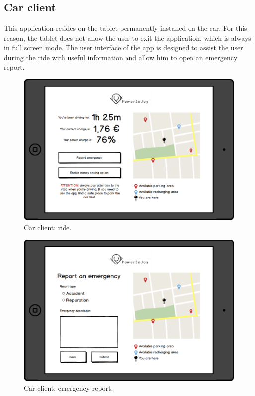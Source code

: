 \subsection{Car client}
	This application resides on the tablet permanently installed on the car. For this reason, the tablet does not allow the user to exit the application, which is always in full screen mode. The user interface of the app is designed to assist the user during the ride with useful information and allow him to open an emergency report.

	\begin{figure}[h]
		\includegraphics[height=0.4\textheight, center]{img/user_interface_design/Car_ride.png}
		\caption{Car client: ride.}
	\end{figure}
	\begin{figure}[h]
		\includegraphics[height=0.4\textheight, center]{img/user_interface_design/Car_emergency_report.png}
		\caption{Car client: emergency report.}
	\end{figure}
\FloatBarrier

